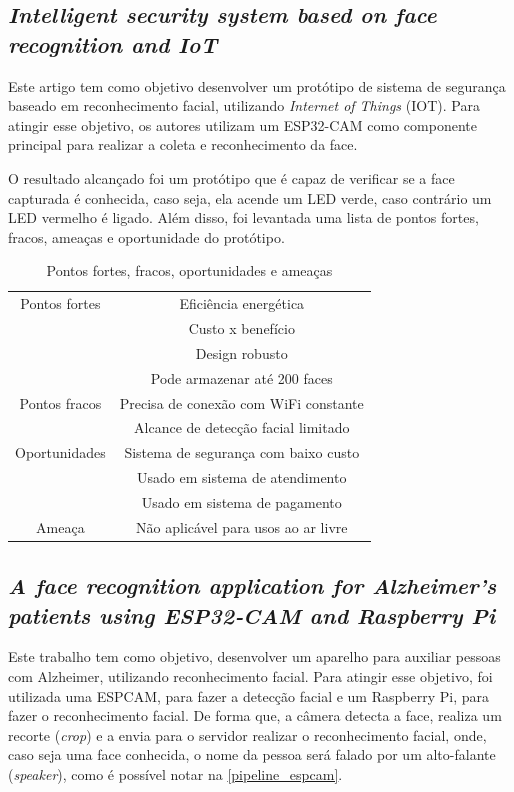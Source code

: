\subsection{\textit{Intelligent security system based on face recognition and IoT}}
Este artigo \cite{bagchi20222133} tem como objetivo desenvolver um protótipo de sistema de segurança baseado em reconhecimento facial,
utilizando \textit{Internet of Things} (IOT). Para atingir esse objetivo, os autores utilizam um ESP32-CAM como componente
principal para realizar a coleta e reconhecimento da face.

O resultado alcançado foi um protótipo que é capaz de verificar se a face capturada é conhecida, caso seja, ela acende um
LED verde, caso contrário um LED vermelho é ligado. Além disso, foi levantada uma lista de pontos fortes, fracos, ameaças
e oportunidade do protótipo.

\begin{center}
\begin{table}[htb]
\centering
\ABNTEXfontereduzida
\caption[Pontos fortes, fracos, oportunidades e ameaças]{Pontos fortes, fracos, oportunidades e ameaças}
\label{tabela_swot}
\begin{tabular}{ |c|c| }
	\hline
	Pontos fortes & Eficiência energética \\
		    & Custo x benefício \\
		    & Design robusto \\
		    & Pode armazenar até 200 faces \\
	\hline
	Pontos fracos & Precisa de conexão com WiFi constante \\
	 	    & Alcance de detecção facial limitado \\
	\hline
	Oportunidades & Sistema de segurança com baixo custo\\
		 & Usado em sistema de atendimento \\
		 & Usado em sistema de pagamento \\
	\hline
	Ameaça & Não aplicável para usos ao ar livre \\
	\hline
\end{tabular}
\end{table}
\end{center}

\subsection{\textit{A face recognition application for Alzheimer’s patients using ESP32‑CAM and Raspberry Pi}}
Este trabalho \cite{espcamAlzheimer} tem como objetivo, desenvolver um aparelho para auxiliar pessoas com Alzheimer,
utilizando reconhecimento facial. Para atingir esse objetivo, foi utilizada uma ESPCAM, para fazer a detecção facial
e um Raspberry Pi, para fazer o reconhecimento facial. De forma que, a câmera detecta a face, realiza um recorte
(\textit{crop}) e a envia para o servidor realizar o reconhecimento facial, onde, caso seja uma face conhecida, o nome da pessoa será
falado por um alto-falante (\textit{speaker}), como é possível notar na \autoref{pipeline_espcam}.

